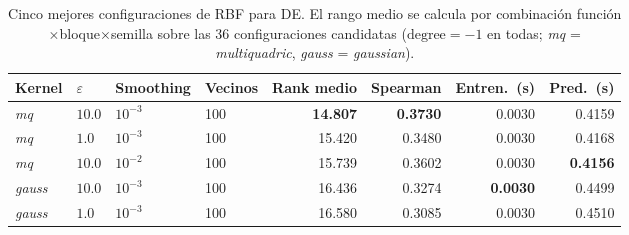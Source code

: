 \begin{table}[H]
    \centering
    \small
    \setlength{\tabcolsep}{4pt}
    \begin{adjustbox}{max width=\textwidth}
        \begin{tabular}{llll|rrrr}
            \toprule
            \textbf{Kernel} & \textbf{$\varepsilon$} & \textbf{Smoothing} & \textbf{Vecinos} & \textbf{Rank medio} & \textbf{Spearman} & \textbf{Entren.\ (s)} & \textbf{Pred.\ (s)} \\
            \midrule
            \textit{mq} & $10.0$ & $10^{-3}$ & 100 & \textbf{14.807} & \textbf{0.3730} & 0.0030 & 0.4159 \\
            \textit{mq} & $1.0$ & $10^{-3}$ & 100 & 15.420 & 0.3480 & 0.0030 & 0.4168 \\
            \textit{mq} & $10.0$ & $10^{-2}$ & 100 & 15.739 & 0.3602 & 0.0030 & \textbf{0.4156} \\
            \textit{gauss} & $10.0$ & $10^{-3}$ & 100 & 16.436 & 0.3274 & \textbf{0.0030} & 0.4499 \\
            \textit{gauss} & $1.0$ & $10^{-3}$ & 100 & 16.580 & 0.3085 & 0.0030 & 0.4510 \\
            \bottomrule
        \end{tabular}
    \end{adjustbox}
    \caption[Cinco mejores configuraciones de RBF para DE según rango medio sobre Spearman interno.]{Cinco mejores configuraciones de RBF para DE. El rango medio se calcula por combinación función$\times$bloque$\times$semilla sobre las 36 configuraciones candidatas ($\text{degree}=-1$ en todas; \textit{mq} = \textit{multiquadric}, \textit{gauss} = \textit{gaussian}).}
    \label{tab:ajuste_interno_rbf_de}
\end{table}
